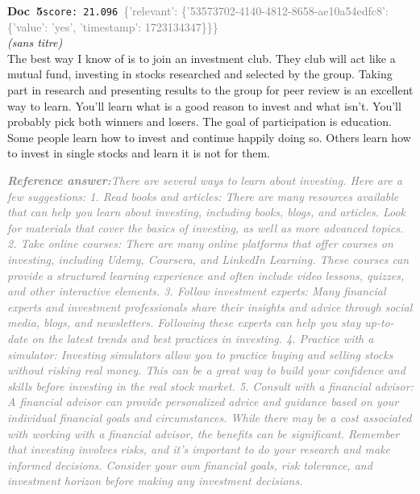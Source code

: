 \documentclass[a4paper,11pt]{article}
\begin{document}
\begin{docenv}
{\footnotesize\textcolor{doccolor}{\textbf{Doc~5}}}\hfill{\tiny\texttt{score:~21.096}}\ {\tiny\textcolor{gray}{\{'relevant': \{'53573702-4140-4812-8658-ae10a54edfc8': \{'value': 'yes', 'timestamp': 1723134347\}\}\}}}\\[3pt]
{\small\textit{(sans titre)}}\\[2pt]
\vspace{2pt}
{\footnotesize 
The best way I know of is to join an investment club.  They club will act like a mutual fund, investing in stocks researched and selected by the group.  Taking part in research and presenting results to the group for peer review is an excellent way to learn.  You'll learn what is a good reason to invest and what isn't. You'll probably pick both winners and losers. The goal of participation is education.  Some people learn how to invest and continue happily doing so. Others learn how to invest in single stocks and learn it is not for them.}
\end{docenv}
\begin{refanswerenv}
{\footnotesize\textit{\textcolor{gray}{\textbf{Reference answer:}\enspace There are several ways to learn about investing. Here are a few suggestions:
1. Read books and articles: There are many resources available that can help you learn about investing, including books, blogs, and articles. Look for materials that cover the basics of investing, as well as more advanced topics.
2. Take online courses: There are many online platforms that offer courses on investing, including Udemy, Coursera, and LinkedIn Learning. These courses can provide a structured learning experience and often include video lessons, quizzes, and other interactive elements.
3. Follow investment experts: Many financial experts and investment professionals share their insights and advice through social media, blogs, and newsletters. Following these experts can help you stay up-to-date on the latest trends and best practices in investing.
4. Practice with a simulator: Investing simulators allow you to practice buying and selling stocks without risking real money. This can be a great way to build your confidence and skills before investing in the real stock market.
5. Consult with a financial advisor: A financial advisor can provide personalized advice and guidance based on your individual financial goals and circumstances. While there may be a cost associated with working with a financial advisor, the benefits can be significant.
Remember that investing involves risks, and it's important to do your research and make informed decisions. Consider your own financial goals, risk tolerance, and investment horizon before making any investment decisions.}}}
\end{refanswerenv}
\end{document}
